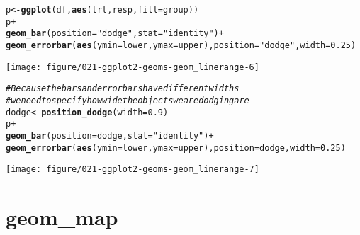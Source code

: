 \documentclass[a4paper,titlepage]{tufte-handout}\usepackage[]{graphicx}\usepackage[]{color}
\makeatletter
\def\maxwidth{ %
  \ifdim\Gin@nat@width>\linewidth
    \linewidth
  \else
    \Gin@nat@width
  \fi
}
\newcommand{\hlnum}[1]{\textcolor[rgb]{0.686,0.059,0.569}{#1}}%
\newcommand{\hlstr}[1]{\textcolor[rgb]{0.192,0.494,0.8}{#1}}%
\newcommand{\hlcom}[1]{\textcolor[rgb]{0.678,0.584,0.686}{\textit{#1}}}%
\newcommand{\hlopt}[1]{\textcolor[rgb]{0,0,0}{#1}}%
\newcommand{\hlstd}[1]{\textcolor[rgb]{0.345,0.345,0.345}{#1}}%
\newcommand{\hlkwb}[1]{\textcolor[rgb]{0.69,0.353,0.396}{#1}}%
\newcommand{\hlkwc}[1]{\textcolor[rgb]{0.333,0.667,0.333}{#1}}%
\newcommand{\hlkwd}[1]{\textcolor[rgb]{0.737,0.353,0.396}{\textbf{#1}}}%
\newenvironment{kframe}{%
 \def\at@end@of@kframe{}%
 \ifinner\ifhmode%
  \def\at@end@of@kframe{\end{minipage}}%
  \begin{minipage}{\columnwidth}%
 \fi\fi%
 \def\FrameCommand##1{\hskip\@totalleftmargin \hskip-\fboxsep
 \colorbox{shadecolor}{##1}\hskip-\fboxsep
     \hskip-\linewidth \hskip-\@totalleftmargin \hskip\columnwidth}%
 \MakeFramed {\advance\hsize-\width
   \@totalleftmargin\z@ \linewidth\hsize
   \@setminipage}}%
 {\par\unskip\endMakeFramed%
 \at@end@of@kframe}
\newenvironment{knitrout}{}{} %
\makeatother
\begin{document}
\begin{knitrout}
\begin{kframe}
\begin{alltt}
\hlstd{p} \hlkwb{<-} \hlkwd{ggplot}\hlstd{(df,} \hlkwd{aes}\hlstd{(trt, resp,} \hlkwc{fill} \hlstd{= group))}
\hlstd{p} \hlopt{+}
 \hlkwd{geom_bar}\hlstd{(}\hlkwc{position} \hlstd{=} \hlstr{"dodge"}\hlstd{,} \hlkwc{stat} \hlstd{=} \hlstr{"identity"}\hlstd{)} \hlopt{+}
 \hlkwd{geom_errorbar}\hlstd{(}\hlkwd{aes}\hlstd{(}\hlkwc{ymin} \hlstd{= lower,} \hlkwc{ymax} \hlstd{= upper),} \hlkwc{position} \hlstd{=} \hlstr{"dodge"}\hlstd{,} \hlkwc{width} \hlstd{=} \hlnum{0.25}\hlstd{)}
\end{alltt}
\end{kframe}
\texttt{[image: figure/021-ggplot2-geoms-geom\_linerange-6]} 
\begin{kframe}\begin{alltt}
\hlcom{# Because the bars and errorbars have different widths}
\hlcom{# we need to specify how wide the objects we are dodging are}
\hlstd{dodge} \hlkwb{<-} \hlkwd{position_dodge}\hlstd{(}\hlkwc{width}\hlstd{=}\hlnum{0.9}\hlstd{)}
\hlstd{p} \hlopt{+}
  \hlkwd{geom_bar}\hlstd{(}\hlkwc{position} \hlstd{= dodge,} \hlkwc{stat} \hlstd{=} \hlstr{"identity"}\hlstd{)} \hlopt{+}
  \hlkwd{geom_errorbar}\hlstd{(}\hlkwd{aes}\hlstd{(}\hlkwc{ymin} \hlstd{= lower,} \hlkwc{ymax} \hlstd{= upper),} \hlkwc{position} \hlstd{= dodge,} \hlkwc{width} \hlstd{=} \hlnum{0.25}\hlstd{)}
\end{alltt}
\end{kframe}
\texttt{[image: figure/021-ggplot2-geoms-geom\_linerange-7]} 

\end{knitrout}


\section{geom\_map}
\end{document}

